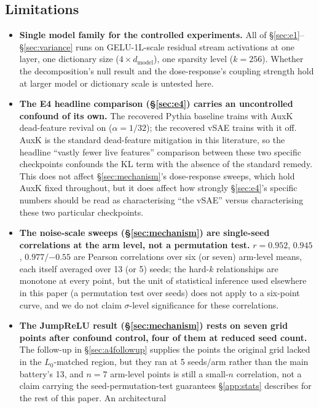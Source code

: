 \documentclass[11pt]{article}
\begin{document}
\subsection{Limitations}

\begin{itemize}
\item \textbf{Single model family for the controlled experiments.} All of
  \S\ref{sec:e1}--\S\ref{sec:variance} runs on GELU-1L-scale residual stream
  activations at one layer, one dictionary size ($4\times d_{\mathrm{model}}$),
  one sparsity level ($k=256$). Whether the decomposition's null result and
  the dose-response's coupling strength hold at larger model or dictionary
  scale is untested here.
\item \textbf{The E4 headline comparison (\S\ref{sec:e4}) carries an
  uncontrolled confound of its own.} The recovered Pythia baseline trains
  with AuxK dead-feature revival on ($\alpha=1/32$); the recovered vSAE
  trains with it off. AuxK is the standard dead-feature mitigation in this
  literature, so the headline ``vastly fewer live features'' comparison
  between these two specific checkpoints confounds the KL term with the
  absence of the standard remedy. This does not affect
  \S\ref{sec:mechanism}'s dose-response sweeps, which hold AuxK fixed
  throughout, but it does affect how strongly \S\ref{sec:e4}'s specific
  numbers should be read as characterising ``the vSAE'' versus
  characterising these two particular checkpoints.
\item \textbf{The noise-scale sweeps (\S\ref{sec:mechanism}) are single-seed
  correlations at the arm level, not a permutation test.} $r=0.952$,
  $0.945$, $0.977/{-0.55}$ are Pearson correlations over six (or seven)
  arm-level means, each itself averaged over 13 (or 5) seeds; the hard-$k$
  relationships are monotone at every point, but the unit of statistical inference
  used elsewhere in this paper (a permutation test over seeds) does not
  apply to a six-point curve, and we do not claim $\sigma$-level
  significance for these correlations.
\item \textbf{The JumpReLU result (\S\ref{sec:mechanism}) rests on seven grid
  points after confound control, four of them at reduced seed count.} The
  follow-up in \S\ref{sec:a4followup} supplies the points the original grid
  lacked in the $L_0$-matched region, but they ran at 5 seeds/arm rather than
  the main battery's 13, and $n=7$ arm-level points is still a small-$n$
  correlation, not a claim carrying the seed-permutation-test guarantees
  \S\ref{app:stats} describes for the rest of this paper. An architectural

\end{itemize}
\end{document}
